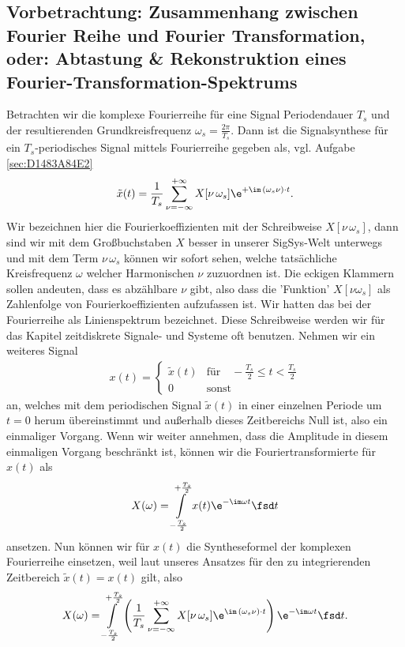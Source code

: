 \subsection*{Vorbetrachtung: Zusammenhang zwischen Fourier Reihe und Fourier
Transformation,
oder:
Abtastung \& Rekonstruktion eines Fourier-Transformation-Spektrums}
%
Betrachten wir die komplexe Fourierreihe für eine Signal Periodendauer
$T_s$ und der resultierenden Grundkreisfrequenz $\omega_s=\frac{2\pi}{T_s}$.
Dann ist die Signalsynthese für ein $T_s$-periodisches Signal mittels Fourierreihe
gegeben als, vgl. Aufgabe \eqref{sec:D1483A84E2} %
\begin{align}
  \tilde{x}(t) = \frac{1}{T_s}\sum_{\nu=-\infty}^{+\infty} X[\nu\,\omega_s]
  \e^{+\im\,(\omega_s \nu)\cdot t}.
\end{align}
Wir bezeichnen hier die Fourierkoeffizienten mit der Schreibweise
$X[\nu\,\omega_s]$,
dann sind wir mit dem Großbuchstaben $X$ besser in unserer SigSys-Welt unterwegs und mit
dem Term $\nu\,\omega_s$ können wir sofort sehen,
welche tatsächliche Kreisfrequenz $\omega$ welcher Harmonischen $\nu$ zuzuordnen ist.
Die eckigen Klammern sollen andeuten, dass
es abzählbare $\nu$ gibt, also dass die 'Funktion' $X[\nu\omega_s]$
als Zahlenfolge von Fourierkoeffizienten aufzufassen ist.
Wir hatten das bei der Fourierreihe
als Linienspektrum bezeichnet.
Diese Schreibweise werden wir für das Kapitel zeitdiskrete
Signale- und Systeme oft benutzen.
%
Nehmen wir ein weiteres Signal
\begin{align}
  x(t) =
  \begin{cases}
  \tilde{x}(t)&\text{für}\quad-\frac{T_s}{2} \leq t < \frac{T_s}{2}\\
  0&\text{sonst}
  \end{cases}
\end{align}
an, welches mit dem periodischen Signal $\tilde{x}(t)$
in einer einzelnen Periode um $t=0$ herum übereinstimmt
und außerhalb dieses Zeitbereichs Null ist, also ein einmaliger Vorgang.
Wenn wir weiter annehmen, dass die Amplitude in diesem einmaligen Vorgang beschränkt ist,
können wir die Fouriertransformierte für $x(t)$ als
\begin{align}
  X(\omega) = \int\limits_{-\frac{T_s}{2}}^{+\frac{T_s}{2}} x(t) \e^{-\im\omega t} \fsd t
\end{align}
ansetzen.
Nun können wir für $x(t)$ die Syntheseformel der komplexen Fourierreihe einsetzen,
weil laut unseres Ansatzes für den zu integrierenden Zeitbereich $\tilde{x}(t) = x(t)$ gilt,
also
\begin{align}
X(\omega) = \int\limits_{-\frac{T_s}{2}}^{+\frac{T_s}{2}}
\left(\frac{1}{T_s}\sum_{\nu=-\infty}^{+\infty} X[\nu\,\omega_s] \e^{\im\,(\omega_s \nu)\cdot t}\right)
\e^{-\im\omega t} \fsd t.
\end{align}
